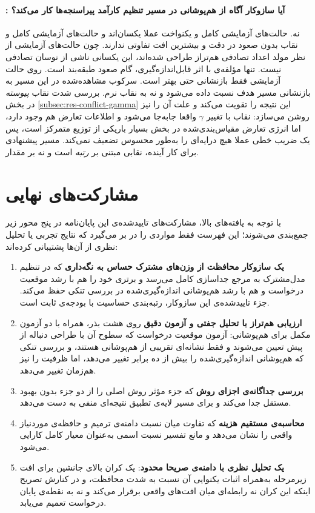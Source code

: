 \paragraph{: آیا سازوکار آگاه از هم‌پوشانی در مسیر تنظیم کارآمد پیراسنجه‌ها کار می‌کند؟} نه. حالت‌های آزمایشی کامل و یکنواخت عملا یکسان‌اند و حالت‌های آزمایشی کامل و نقاب بدون صعود در دقت و بیشترین افت تفاوتی ندارند. چون حالت‌های آزمایشی از نظر مولد اعداد تصادفی هم‌تراز طراحی شده‌اند، این یکسانی ناشی از نوسان تصادفی نیست. تنها مؤلفه‌ی با اثر قابل‌اندازه‌گیری، گام صعود طبقه‌بند است. روی  حالت آزمایشی فقط بازنشانی حتی بهتر است. سرکوب مشاهده‌شده در این مسیر به بازنشانی مسیر هدف نسبت داده می‌شود و نه به نقاب نرم. بررسی شدت نقاب \emph{پیوسته} در بخش \ref{subsec:res-conflict-gamma} این نتیجه را تقویت می‌کند و علت آن را نیز روشن می‌سازد: نقاب با تغییر $\gamma$ واقعا جابه‌جا می‌شود و اطلاعات تعارض هم وجود دارد، اما انرژی تعارض مقیاس‌بندی‌شده در بخش بسیار باریکی از توزیع متمرکز است، پس یک ضریب خطی عملا هیچ درایه‌ای را به‌طور محسوس تضعیف نمی‌کند. مسیر پیشنهادی برای کار آینده، نقابی مبتنی بر \emph{رتبه} است و نه بر مقدار.

\section{مشارکت‌های نهایی}
\label{sec:concl-contributions}

با توجه به یافته‌های بالا، مشارکت‌های تاییدشده‌ی این پایان‌نامه در پنج محور زیر جمع‌بندی می‌شوند؛ این فهرست فقط مواردی را در بر می‌گیرد که نتایج تجربی یا تحلیل نظری از آن‌ها پشتیبانی کرده‌اند:

\begin{enumerate}
	\item \textbf{یک سازوکار محافظت از وزن‌های مشترک حساس به نگه‌داری} که در تنظیم مدل‌مشترک به مرجع جداسازی کامل می‌رسد و برتری خود را هم با رشد موقعیت درخواست و هم با رشد هم‌پوشانی اندازه‌گیری‌شده در بررسی تنکی حفظ می‌کند. جزء تاییدشده‌ی این سازوکار، رتبه‌بندی حساسیت با بودجه‌ی ثابت است.
	\item \textbf{ارزیابی هم‌تراز با تحلیل جفتی و آزمون دقیق} روی هشت بذر، همراه با دو آزمون مکمل برای هم‌پوشانی: آزمون موقعیت درخواست که سطوح آن با طراحی دنباله از پیش تعیین می‌شوند و فقط نشانه‌ای تقریبی از هم‌پوشانی هستند، و بررسی تنکی که هم‌پوشانی اندازه‌گیری‌شده را بیش از ده برابر تغییر می‌دهد، اما ظرفیت را نیز هم‌زمان تغییر می‌دهد.
	\item \textbf{بررسی جداگانه‌ی اجزای روش} که جزء مؤثر روش اصلی را از دو جزء بدون بهبود مستقل جدا می‌کند و برای مسیر لایه‌ی تطبیق نتیجه‌ای منفی به دست می‌دهد.
	\item \textbf{محاسبه‌ی مستقیم هزینه} که تفاوت میان نسبت دامنه‌ی ترمیم و حافظه‌ی موردنیاز واقعی را نشان می‌دهد و مانع تفسیر نسبت اسمی به‌عنوان معیار کامل کارایی می‌شود.
	\item \textbf{یک تحلیل نظری با دامنه‌ی صریحا محدود}: یک کران بالای جانشین برای افت زیرمرحله به‌همراه اثبات یکنوایی آن نسبت به شدت محافظت، و در کنارش تصریح اینکه این کران نه رابطه‌ای میان افت‌های واقعی برقرار می‌کند و نه به نقطه‌ی پایان درخواست تعمیم می‌یابد.
\end{enumerate}


